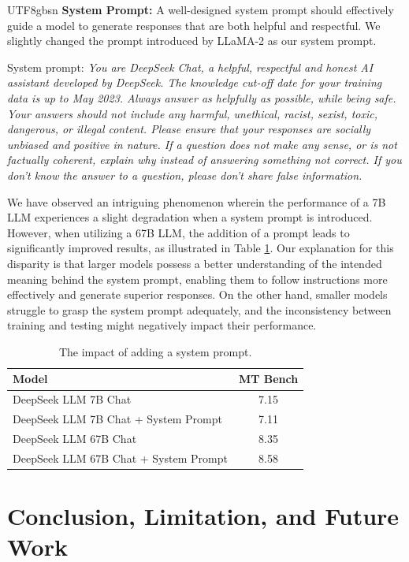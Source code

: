 \documentclass[11pt, a4paper, logo, copyright, nonumbering]{deepseek}
\begin{document}
\begin{CJK*}{UTF8}{gbsn}
\textbf{System Prompt:} A well-designed system prompt should effectively guide a model to generate responses that are both helpful and respectful. We slightly changed the prompt introduced by LLaMA-2 as our system prompt. 

System prompt: \textit{You are DeepSeek Chat, a helpful, respectful and honest AI assistant developed by DeepSeek. The knowledge cut-off date for your training data is up to May 2023. Always answer as helpfully as possible, while being safe. Your answers should not include any harmful, unethical, racist, sexist, toxic, dangerous, or illegal content. Please ensure that your responses are socially unbiased and positive in nature. If a question does not make any sense, or is not factually coherent, explain why instead of answering something not correct. If you don’t know the answer to a question, please don’t share false information.}  

We have observed an intriguing phenomenon wherein the performance of a 7B LLM experiences a slight degradation when a system prompt is introduced. However, when utilizing a 67B LLM, the addition of a prompt leads to significantly improved results, as illustrated in Table \ref{table:prompt}. Our explanation for this disparity is that larger models possess a better understanding of the intended meaning behind the system prompt, enabling them to follow instructions more effectively and generate superior responses. On the other hand, smaller models struggle to grasp the system prompt adequately, and the inconsistency between training and testing might negatively impact their performance.

\begin{table}[ht]
\centering
\begin{tabular}{lc}
	\toprule  \small
Model &  MT Bench \\ \midrule
DeepSeek LLM 7B Chat & 7.15 \\ 
DeepSeek LLM 7B Chat + System Prompt & 7.11 \\ 	 
DeepSeek LLM 67B Chat & 8.35
\\ 
DeepSeek LLM 67B Chat + System Prompt & 8.58\\ 	
\bottomrule
\end{tabular}
\caption{\centering The impact of adding a system prompt.}
\label{table:prompt}
\end{table}

\section{Conclusion, Limitation, and Future Work}
\label{sec:conclusion}


\end{CJK*}
\end{document}
